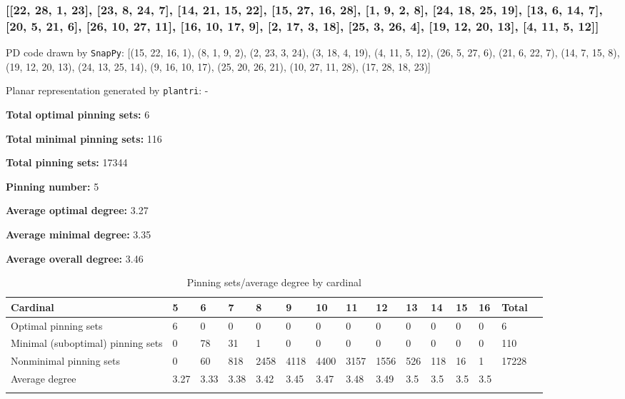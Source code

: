 \documentclass{article}%
\begin{document}
\newpage

\subsubsection{[[22, 28, 1, 23], [23, 8, 24, 7], [14, 21, 15, 22], [15, 27, 16, 28], [1, 9, 2, 8], [24, 18, 25, 19], [13, 6, 14, 7], [20, 5, 21, 6], [26, 10, 27, 11], [16, 10, 17, 9], [2, 17, 3, 18], [25, 3, 26, 4], [19, 12, 20, 13], [4, 11, 5, 12]]}

{\small\noindent PD code drawn by \texttt{SnapPy}: [(15, 22, 16, 1), (8, 1, 9, 2), (2, 23, 3, 24), (3, 18, 4, 19), (4, 11, 5, 12), (26, 5, 27, 6), (21, 6, 22, 7), (14, 7, 15, 8), (19, 12, 20, 13), (24, 13, 25, 14), (9, 16, 10, 17), (25, 20, 26, 21), (10, 27, 11, 28), (17, 28, 18, 23)]}

{\small\noindent Planar representation generated by \texttt{plantri}: -}

\begin{multicols}{2}
{\normalsize \noindent\textbf{Total optimal pinning sets:} 6

\noindent\textbf{Total minimal pinning sets:} 116

\noindent\textbf{Total pinning sets:} 17344

\noindent\textbf{Pinning number:} 5

}
\columnbreak

{\normalsize \noindent\textbf{Average optimal degree:} 3.27

\noindent\textbf{Average minimal degree:} 3.35

\noindent\textbf{Average overall degree:} 3.46

}
\end{multicols}

\begin{table}[ht]
	\caption{Pinning sets/average degree by cardinal}
	\centering
	\renewcommand{\arraystretch}{1.5}
	\begin{tabularx}{\textwidth}{lXXXXXXXXXXXXXX}
		\toprule
			Cardinal & 5 & 6 & 7 & 8 & 9 & 10 & 11 & 12 & 13 & 14 & 15 & 16 & Total\\
			\hline
			Optimal pinning sets & 6 & 0 & 0 & 0 & 0 & 0 & 0 & 0 & 0 & 0 & 0 & 0 & 6 \\
			Minimal (suboptimal) pinning sets & 0 & 78 & 31 & 1 & 0 & 0 & 0 & 0 & 0 & 0 & 0 & 0 & 110 \\
			Nonminimal pinning sets & 0 & 60 & 818 & 2458 & 4118 & 4400 & 3157 & 1556 & 526 & 118 & 16 & 1 & 17228 \\
			Average degree & 3.27 & 3.33 & 3.38 & 3.42 & 3.45 & 3.47 & 3.48 & 3.49 & 3.5 & 3.5 & 3.5 & 3.5 &  \\
		\bottomrule \\ 
	\end{tabularx}
\end{table}
\end{document}
